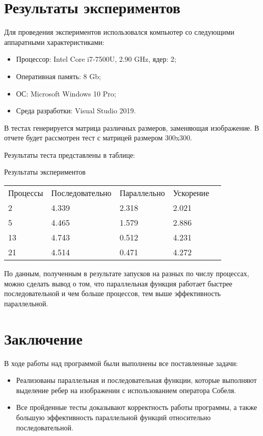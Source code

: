 \documentclass{report}
\begin{document}
	\section*{Результаты экспериментов}
	Для проведения экспериментов использовался компьютер со следующими аппаратными характеристиками:
	\begin{itemize}
		\item Процессор: Intel Core i7-7500U, 2.90 GHz, ядер: 2;
		\item Оперативная память: 8 Gb;
		\item ОС: Microsoft Windows 10 Pro;
		\item Среда разработки: Visual Studio 2019.
	\end{itemize}
	\par В тестах генерируется матрица различных размеров, заменяющая изображение. В отчете будет рассмотрен тест с матрицей размером 300x300.
	\par Результаты теста представлены в таблице:
	\begin{table}[!h]
		{Результаты экспериментов}
		\centering
		\begin{tabular}{lllll}
			Процессы & Последовательно & Параллельно & Ускорение  \\
			2        & 4.339           & 2.318       & 2.021      \\
			5        & 4.465           & 1.579       & 2.886      \\
			13       & 4.743           & 0.512       & 4.231      \\
			21       & 4.514           & 0.471       & 4.272      

		\end{tabular}
	\end{table}
	\par По данным, полученным в результате запусков на разных по числу процессах, можно сделать вывод о том, что параллельная функция работает быстрее последовательной и чем больше процессов, тем выше эффективность параллельной.
	\newpage

	\section*{Заключение}
	В ходе работы над программой были выполнены все поставленные задачи: \begin{itemize}
		 \item Реализованы параллельная и последовательная функции, которые выполняют выделение ребер на изображении с использованием оператора Собеля. 
		 \item Все пройденные тесты доказывают корректность работы программы, а также большую эффективность параллельной функций относительно последовательной.
	\end{itemize}
	\newpage
\end{document}
